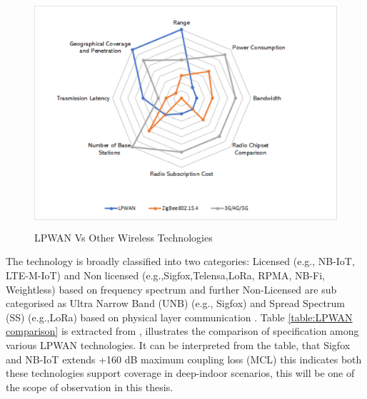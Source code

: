 \documentclass[12pt]{article}
\begin{document}
\begin{figure}[H]
  \includegraphics[trim={3cm 0 4cm 0},width=\columnwidth,height=8.5cm,keepaspectratio]{Images/lpwan_radar_3.pdf}
  \centering
  \caption{LPWAN Vs Other Wireless Technologies \cite{lpwanradar}}
  \label{fig:LPWAN Vs Other Wireless Technologies}
\end{figure}

The technology is broadly classified into two categories: Licensed (e.g., NB-IoT, LTE-M-IoT) and Non licensed (e.g.,Sigfox,Telensa,LoRa, RPMA, NB-Fi, Weightless) based on frequency spectrum \cite{8612009} and further Non-Licensed are sub categorised as Ultra Narrow Band (UNB) (e.g., Sigfox) and Spread Spectrum (SS) (e.g.,LoRa) based on physical layer communication \cite{8544414}. Table \ref{table:LPWAN comparison} is extracted from \cite{LPWANspecs}, illustrates the comparison of specification among various LPWAN technologies. It can be interpreted from the table, that Sigfox and NB-IoT extends +160 dB maximum coupling loss (MCL) this indicates both these technologies support coverage in deep-indoor scenarios, this will be one of the scope of observation in this thesis. \par
\end{document}
